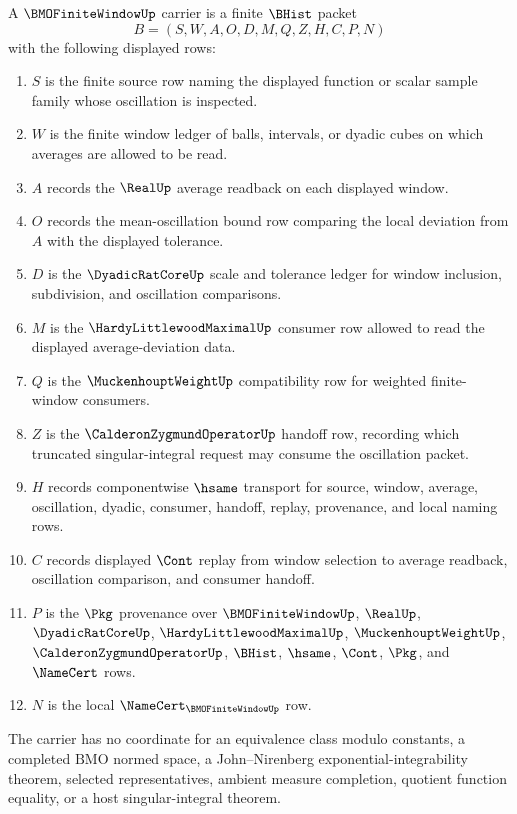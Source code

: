 \begin{definition}
\label{def:bmo-finite-window-carrier}
A $\BMOFiniteWindowUp$ carrier is a finite $\BHist$ packet
$$
B=(S,W,A,O,D,M,Q,Z,H,C,P,N)
$$
with the following displayed rows:
\begin{enumerate}
\item $S$ is the finite source row naming the displayed function or scalar sample family whose oscillation is inspected.
\item $W$ is the finite window ledger of balls, intervals, or dyadic cubes on which averages are allowed to be read.
\item $A$ records the $\RealUp$ average readback on each displayed window.
\item $O$ records the mean-oscillation bound row comparing the local deviation from $A$ with the displayed tolerance.
\item $D$ is the $\DyadicRatCoreUp$ scale and tolerance ledger for window inclusion, subdivision, and oscillation comparisons.
\item $M$ is the $\HardyLittlewoodMaximalUp$ consumer row allowed to read the displayed average-deviation data.
\item $Q$ is the $\MuckenhouptWeightUp$ compatibility row for weighted finite-window consumers.
\item $Z$ is the $\CalderonZygmundOperatorUp$ handoff row, recording which truncated singular-integral request may consume the oscillation packet.
\item $H$ records componentwise $\hsame$ transport for source, window, average, oscillation, dyadic, consumer, handoff, replay, provenance, and local naming rows.
\item $C$ records displayed $\Cont$ replay from window selection to average readback, oscillation comparison, and consumer handoff.
\item $P$ is the $\Pkg$ provenance over $\BMOFiniteWindowUp$, $\RealUp$, $\DyadicRatCoreUp$, $\HardyLittlewoodMaximalUp$, $\MuckenhouptWeightUp$, $\CalderonZygmundOperatorUp$, $\BHist$, $\hsame$, $\Cont$, $\Pkg$, and $\NameCert$ rows.
\item $N$ is the local $\NameCert_{\BMOFiniteWindowUp}$ row.
\end{enumerate}
The carrier has no coordinate for an equivalence class modulo constants, a completed $\mathrm{BMO}$ normed space, a John--Nirenberg exponential-integrability theorem, selected representatives, ambient measure completion, quotient function equality, or a host singular-integral theorem.
\end{definition}

